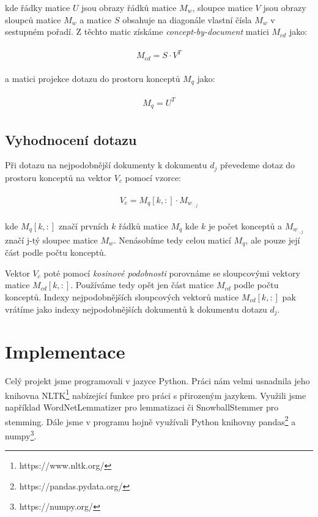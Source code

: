 \documentclass[11pt]{scrartcl} %
\begin{document}
kde řádky matice $U$ jsou obrazy řádků matice $M_w$, sloupce matice $V$ jsou obrazy sloupců matice $M_w$ a matice $S$ obsahuje na diagonále vlastní čísla $M_w$ v sestupném pořadí. Z těchto matic získáme \emph{concept-by-document} matici $M_{cd}$ jako:

\begin{align}
	\begin{split}
		M_{cd} = S \cdot V^T
	\end{split}					
\end{align}

a matici projekce dotazu do prostoru konceptů $M_q$ jako:

\begin{align}
	\begin{split}
		M_q = U^T
	\end{split}					
\end{align}

\subsection{Vyhodnocení dotazu}

Při dotazu na nejpodobnější dokumenty k dokumentu $d_j$ převedeme dotaz do prostoru konceptů na vektor $V_c$ pomocí vzorce:

\begin{align}
	\begin{split}
		V_c = M_q[k,:] \cdot M_{w_{:,j}}
	\end{split}					
\end{align}

kde $M_q[k,:]$ značí prvních $k$ řádků matice $M_q$ kde $k$ je počet konceptů a $M_{w_{:,j}}$ značí j-tý sloupec matice $M_w$. Nenásobíme tedy celou maticí $M_q$, ale pouze její část podle počtu konceptů.

\bigskip

Vektor $V_c$ poté pomocí \emph{kosinové podobnosti} porovnáme se sloupcovými vektory matice $M_{cd}[k, :]$. Používáme tedy opět jen část matice $M_{cd}$ podle počtu konceptů. Indexy nejpodobnějších sloupcových vektorů matice $M_{cd}[k, :]$ pak vrátíme jako indexy nejpodobnějších dokumentů k dokumentu dotazu $d_j$.

\section{Implementace}

Celý projekt jsme programovali v jazyce Python. Práci nám velmi usnadnila jeho knihovna NLTK\footnote{https://www.nltk.org/} nabízející funkce pro práci s přirozeným jazykem. Využili jsme například WordNetLemmatizer pro lemmatizaci či SnowballStemmer pro stemming. Dále jsme v programu hojně využívali Python knihovny pandas\footnote{https://pandas.pydata.org/}  a numpy\footnote{https://numpy.org/}.
\end{document}
